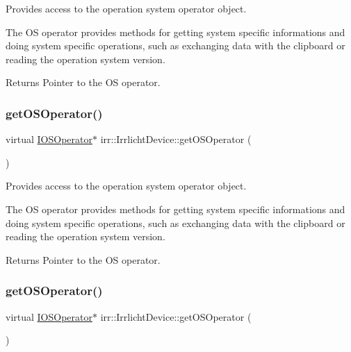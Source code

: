 Provides access to the operation system operator object. 

The OS operator provides methods for getting system specific informations and doing system specific operations, such as exchanging data with the clipboard or reading the operation system version. \begin{DoxyReturn}{Returns}
Pointer to the OS operator. 
\end{DoxyReturn}
\mbox{\label{classirr_1_1IrrlichtDevice_a3833250e8b0d7a94cd34b1e1809033ac}} 
\subsubsection{\texorpdfstring{get\+O\+S\+Operator()}{getOSOperator()}\hspace{0.1cm}{\footnotesize\ttfamily [2/3]}}
{\footnotesize\ttfamily virtual \hyperlink{classirr_1_1IOSOperator}{I\+O\+S\+Operator}$\ast$ irr\+::\+Irrlicht\+Device\+::get\+O\+S\+Operator (\begin{DoxyParamCaption}{ }\end{DoxyParamCaption})\hspace{0.3cm}{\ttfamily [pure virtual]}}



Provides access to the operation system operator object. 

The OS operator provides methods for getting system specific informations and doing system specific operations, such as exchanging data with the clipboard or reading the operation system version. \begin{DoxyReturn}{Returns}
Pointer to the OS operator. 
\end{DoxyReturn}
\mbox{\label{classirr_1_1IrrlichtDevice_a3833250e8b0d7a94cd34b1e1809033ac}} 
\subsubsection{\texorpdfstring{get\+O\+S\+Operator()}{getOSOperator()}\hspace{0.1cm}{\footnotesize\ttfamily [3/3]}}
{\footnotesize\ttfamily virtual \hyperlink{classirr_1_1IOSOperator}{I\+O\+S\+Operator}$\ast$ irr\+::\+Irrlicht\+Device\+::get\+O\+S\+Operator (\begin{DoxyParamCaption}{ }\end{DoxyParamCaption})\hspace{0.3cm}{\ttfamily [pure virtual]}}



